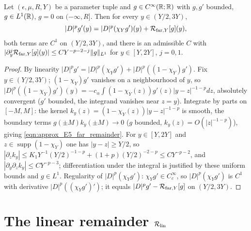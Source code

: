 \begin{lemma}
  \label{lem:c05_far_localization}
  Let $(\epsilon,\mu,R,Y)$ be a parameter tuple and $g\in C^\infty(\mathbb{R};\mathbb{R})$ with $g,g'$ bounded, $g\in L^1(\mathbb{R})$, $g=0$ on $(-\infty,R]$.
  Then for every $y\in(Y/2,3Y)$,
  \begin{equation}\label{eqn:approx_E5_fundamental_localization}
    |D|^pg'(y)=|D|^p(\chi_Yg')(y)+\mathcal{R}_{\textup{far},Y}[g](y),
  \end{equation}
  both terms are $C^1$ on $(Y/2,3Y)$, and there is an admissible $C$ with
  $|\partial_y^j\mathcal{R}_{\textup{far},Y}[g](y)|\le CY^{-p-2-j}\|g\|_{L^1}$ for $y\in[Y,2Y]$, $j=0,1$.
\end{lemma}
\begin{proof}
  By linearity $|D|^pg'=|D|^p(\chi_Yg')+|D|^p((1-\chi_Y)g')$. Fix $y\in(Y/2,3Y)$; $(1-\chi_Y)g'$ vanishes on a neighbourhood
  of $y$, so $|D|^p((1-\chi_Y)g')(y)=-c_\alpha\int(1-\chi_Y(z))g'(z)|y-z|^{-1-p}dz$, absolutely convergent ($g'$ bounded, the
  integrand vanishes near $z=y$). Integrate by parts on $[-M,M]$: the kernel $k_y(z)=(1-\chi_Y(z))|y-z|^{-1-p}$ is smooth, the
  boundary terms $g(\pm M)k_y(\pm M)\to0$ ($g$ bounded, $k_y(z)=O(|z|^{-1-p})$), giving \eqref{eqn:approx_E5_far_remainder}.
  For $y\in[Y,2Y]$ and $z\in\operatorname{supp}(1-\chi_Y)$ one has $|y-z|\ge Y/2$, so
  $|\partial_z k_y|\le K_1Y^{-1}(Y/2)^{-1-p}+(1+p)(Y/2)^{-2-p}\le CY^{-p-2}$, and $|\partial_y\partial_zk_y|\le CY^{-p-3}$;
  differentiation under the integral is justified by these uniform bounds and $g\in L^1$. Regularity of
  $|D|^p(\chi_Yg')$: $\chi_Yg'\in C^\infty_c$, so $|D|^p(\chi_Yg')$ is $C^1$ with derivative $|D|^p((\chi_Yg')')$; it equals $|D|^pg'-\mathcal{R}_{\textup{far},Y}[g]$ on $(Y/2,3Y)$.
\end{proof}

\section{The linear remainder \texorpdfstring{$\mathcal{R}_{\textup{lin}}$}{R\_lin}}

